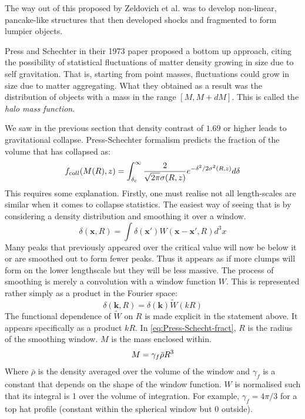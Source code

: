 \documentclass[12pt,a4paper,twoside]{book}
\begin{document}
			The way out of this proposed by Zeldovich et al. was to develop non-linear, pancake-like structures that then developed shocks and fragmented to form lumpier objects.
			
			Press and Schechter in their 1973 paper proposed a bottom up approach, citing the possibility of statistical fluctuations of matter density growing in size due to self gravitation. That is, starting from point masses, fluctuations could grow in size due to matter aggregating. What they obtained as a result was the distribution of objects with a mass in the range $[M, M+dM]$. This is called the \emph{halo mass function}.
			
			We saw in the previous section that density contrast of $1.69$ or higher leads to gravitational collapse. Press-Schechter formalism predicts the fraction of the volume that has collapsed as:
			\begin{equation}
				f_{coll}(M(R),z)=\int_{\delta_c}^{\infty}\frac{2}{\sqrt{2\pi}\sigma(R,z)}e^{-\delta^2/2\sigma^2(R,z)}d\delta\\
				\label{eq:Press-Schecht-fract}
			\end{equation}
			This requires some explanation. Firstly, one must realise not all length-scales are similar when it comes to collapse statistics. The easiest way of seeing that is by considering a density distribution and smoothing it over a window. 
			$$
				\delta(\mathbf{x},R)=\int \delta(\mathbf{x'})W(\mathbf{x-x'},R)d^3x
			$$
			Many peaks that previously appeared over the critical value will now be below it or are smoothed out to form fewer peaks. Thus it appears as if more clumps will form on the lower lengthscale but they will be less massive.
			The process of smoothing is merely a convolution with a window function $W$. This is represented rather simply as a product in the Fourier space:
			$$
				\delta(\mathbf{k},R)=\delta(\mathbf{k})\tilde{W}(kR)
			$$
			The functional dependence of $\tilde{W}$ on $R$ is made explicit in the statement above. It appears specifically as a product $kR$.
			In \ref{eq:Press-Schecht-fract}, $R$ is the radius of the smoothing window. $M$ is the mass enclosed within. 
			$$
				M=\gamma_f\bar{\rho}R^3\\
			$$
			Where $\bar{\rho}$ is the density averaged over the volume of the window and $\gamma_f$ is a constant that depends on the shape of the window function. $W$ is normalised such that its integral is 1 over the volume of integration. For example, $\gamma_f=4\pi/3$ for a top hat profile (constant within the spherical window but 0 outside).
\end{document}
